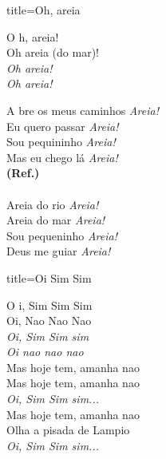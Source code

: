 \documentclass[fontsize=14pt, twoside]{scrreprt}
\begin{document}
\begin{multicols*}{2}
\begin{song}{title={Oh, areia}}
        \begin{chorus*}
            O h, areia!\\
            Oh areia (do mar)!\\
            \textit{Oh areia!}\\
            \textit{Oh areia!}\\
        \end{chorus*}
        \begin{verse*}
            A bre os meus caminhos \textit{Areia!}\\
            Eu quero passar \textit{Areia!}\\
            Sou pequininho \textit{Areia!}\\
            Mas eu chego lá \textit{Areia!}\\
            \textbf{(Ref.)}\\
            \\
            Areia do rio \textit{Areia!}\\
            Areia do mar \textit{Areia!}\\
            Sou pequeninho \textit{Areia!}\\
            Deus me guiar \textit{Areia!}\\
        \end{verse*}
\end{song}



\begin{song}{title={Oi Sim Sim}}
        \begin{verse*}
            O i, Sim Sim Sim\\
            Oi, Nao Nao Nao\\
            \textit{Oi, Sim Sim sim}\\
            \textit{Oi nao nao nao}\\
            Mas hoje tem, amanha nao\\
            Mas hoje tem, amanha nao\\
            \textit{Oi, Sim Sim sim...}\\
            Mas hoje tem, amanha nao\\
            Olha a pisada de Lampio\\
            \textit{Oi, Sim Sim sim...}\\
        \end{verse*}
\end{song}


\end{multicols*}
\end{document}

